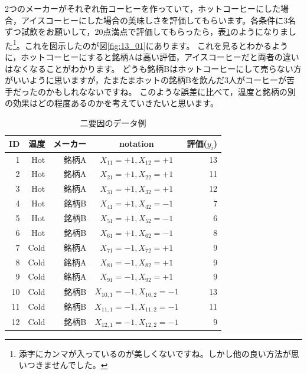 \documentclass{ltjbook}
\begin{document}
2つのメーカーがそれぞれ缶コーヒーを作っていて，ホットコーヒーにした場合，アイスコーヒーにした場合の美味しさを評価してもらいます。各条件に3名ずつ試飲をお願いして，20点満点で評価してもらったら，表\ref{tbl::13_01}のようになりました\footnote{添字にカンマが入っているのが美しくないですね。しかし他の良い方法が思いつきませんでした。}。これを図示したのが図\ref{fig:13_01}にあります。
これを見るとわかるように，ホットコーヒーにすると銘柄Aは高い評価，アイスコーヒーだと両者の違いはなくなることがわかります。
どうも銘柄Bはホットコーヒーにして売らない方がいいように思いますが，たまたまホットの銘柄Bを飲んだ3人がコーヒーが苦手だったのかもしれなないですね。
このような誤差に比べて，温度と銘柄の別の効果はどの程度あるのかを考えていきたいと思います。
\begin{table}[ht]
	\centering
	\caption{二要因のデータ例}
	\begin{tabular}{rrrcr}
		\hline
		ID & 温度   & メーカー & notation                  & 評価($y_{i}$) \\
		\hline
		1  & Hot  & 銘柄A  & $X_{11}=+1,X_{12}=+1$     & 13          \\
		2  & Hot  & 銘柄A  & $X_{21}=+1,X_{22}=+1$     & 11          \\
		3  & Hot  & 銘柄A  & $X_{31}=+1,X_{32}=+1$     & 12          \\
		4  & Hot  & 銘柄B  & $X_{41}=+1,X_{42}=-1$     & 7           \\
		5  & Hot  & 銘柄B  & $X_{51}=+1,X_{52}=-1$     & 6           \\
		6  & Hot  & 銘柄B  & $X_{61}=+1,X_{62}=-1$     & 8           \\
		7  & Cold & 銘柄A  & $X_{71}=-1,X_{72}=+1$     & 9           \\
		8  & Cold & 銘柄A  & $X_{81}=-1,X_{82}=+1$     & 9           \\
		9  & Cold & 銘柄A  & $X_{91}=-1,X_{92}=+1$     & 9           \\
		10 & Cold & 銘柄B  & $X_{10,1}=-1,X_{10,2}=-1$ & 13          \\
		11 & Cold & 銘柄B  & $X_{11,1}=-1,X_{11,2}=-1$ & 11          \\
		12 & Cold & 銘柄B  & $X_{12,1}=-1,X_{12,2}=-1$ & 9           \\
		\hline
	\end{tabular}

	\label{tbl::13_01}
\end{table}
\end{document}
